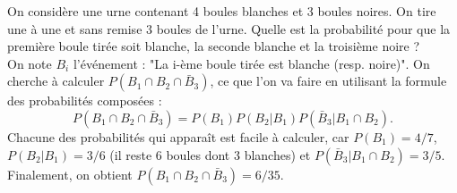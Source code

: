 \documentclass{book}
\begin{document}
\begin{Exemple}
On considère une urne contenant 4 boules blanches et 3 boules noires. On tire une à une et sans remise 3 boules de l'urne. Quelle est la probabilité pour que la première boule tirée soit blanche, la seconde blanche et la troisième noire ?\\
On note $B_i$  l'événement : "La i-ème boule tirée est blanche (resp. noire)". On cherche à calculer $P(B_1\cap B_2 \cap \bar B_3)$, ce que l'on va faire en utilisant la formule des probabilités composées :
$$P(B_1\cap B_2 \cap \bar B_3)=P(B_1)P(B_2|B_1)P(\bar B_3|B_1\cap B_2).$$
Chacune des probabilités qui apparaît est facile à calculer, car $P(B_1)=4/7$, $P(B_2|B_1)=3/6$ (il reste 6 boules dont 3 blanches) et $P(\bar B_3|B_1\cap B_2)=3/5$. Finalement, on obtient $P(B_1\cap B_2 \cap \bar B_3)=6/35$.
\end{Exemple}
\end{document}
